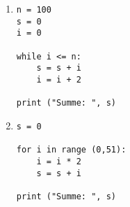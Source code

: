 \begin{enumerate}

\item \begin{lstlisting}[label=KontrollstrukturenSolutionA]
n = 100
s = 0
i = 0

while i <= n:
    s = s + i
    i = i + 2
	
print ("Summe: ", s)
\end{lstlisting} 

\item \begin{lstlisting}[label=KontrollstrukturenSolutionB]	
s = 0

for i in range (0,51):
    i = i * 2
    s = s + i
    
print ("Summe: ", s)
\end{lstlisting} 

\end{enumerate}